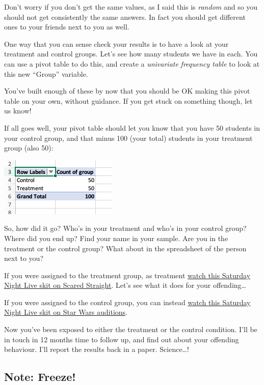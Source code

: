 \documentclass[
]{book}
\begin{document}
Don't worry if you don't get the same values, as I said this is \emph{random} and so you should not get consistently the same answers. In fact you should get different ones to your friends next to you as well.

One way that you can sense check your results is to have a look at your treatment and control groups. Let's see how many students we have in each. You can use a pivot table to do this, and create a \emph{univariate} \emph{frequency table} to look at this new ``Group'' variable.

You've built enough of these by now that you should be OK making this pivot table on your own, without guidance. If you get stuck on something though, let us know!

If all goes well, your pivot table should let you know that you have 50 students in your control group, and that minus 100 (your total) students in your treatment group (also 50):

\includegraphics{imgs/freq_groups.png}

So, how did it go? Who's in your treatment and who's in your control group? Where did you end up? Find your name in your sample. Are you in the treatment or the control group? What about in the spreadsheet of the person next to you?

If you were assigned to the treatment group, as treatment \href{https://www.youtube.com/watch?v=sw1vm_PO8ss}{watch this Saturday Night Live skit on Scared Straight}. Let's see what it does for your offending\ldots{}

If you were assigned to the control group, you can instead \href{https://www.youtube.com/watch?v=-T_pjMr7-n0}{watch this Saturday Night Live skit on Star Wars auditions}.

Now you've been exposed to either the treatment or the control condition. I'll be in touch in 12 months time to follow up, and find out about your offending behaviour. I'll report the results back in a paper. Science\ldots!

\hypertarget{note-freeze}{%
\subsection{Note: Freeze!}\label{note-freeze}}
\end{document}
